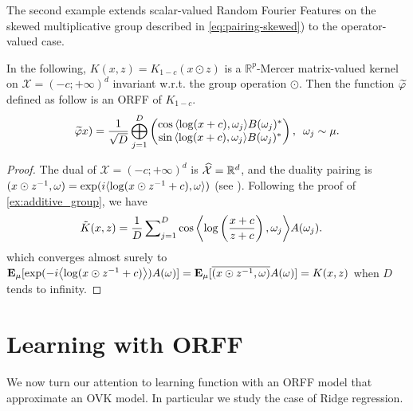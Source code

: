 The second example extends scalar-valued Random Fourier Features on the skewed multiplicative group described in \cref{eq:pairing-skewed}) to the operator-valued case.
\begin{example}
In the following, $K(x,z)=K_{1-c}(x\odot z)$ is a $\mathbb{R}^p$-Mercer matrix-valued kernel on $\mathcal{X}=(-c;+\infty)^d$ invariant w.r.t. the group operation $\odot$. Then the function $\tildePhi{1:D}$ defined as follow is an \acl{ORFF} of $K_{1-c}$.
\begin{equation*}
\begin{aligned}
\tildePhi(x)=\frac{1}{\sqrt{D}}\Vect_{j=1}^D\begin{pmatrix}\cos{\inner{\log(x+c),\omega_j}}B(\omega_j)^\adjoint  \\ \sin{\inner{\log(x+c),\omega_j}}B(\omega_j)^\adjoint \end{pmatrix}, \enskip \omega_j \sim \mu.
\end{aligned}
\end{equation*}
\end{example}
\begin{proof}
The dual of $\mathcal{X}=(-c;+\infty)^d$
is $\dual{\mathcal{X}}=\mathbb{R}^d$, and the duality pairing is $\pairing{x \odot \myinv{z},\omega}=\exp(i\inner{\log(x\odot z^{-1}+c), \omega})$ (see \citet{Li2010}). Following the proof of \cref{ex:additive_group}, we have
\begin{equation*}
\begin{aligned}
\tilde{K}(x,z)&= \frac{1}{D} \sum\nolimits_{j=1}^D \cos{\inner*{\log\left(\frac{x+c}{z+c}\right), \omega_j}}A(\omega_j).
\end{aligned}
\end{equation*}
which converges almost surely to $\expectation_{\mu}[\exp(-i\inner*{\log(x\odot z^{-1}+c)})A(\omega) ]=\expectation_{\mu}[\conj{\pairing{x\odot z^{-1},\omega}}A(\omega)]=K(x, z)$ when $D$ tends to infinity.
\end{proof}

\clearpage
\section{Learning with ORFF}
\label{sec:learning_with_operator-valued_random-fourier_features}
We now turn our attention to learning function with an ORFF model that approximate an OVK model. In particular we study the case of Ridge regression.
